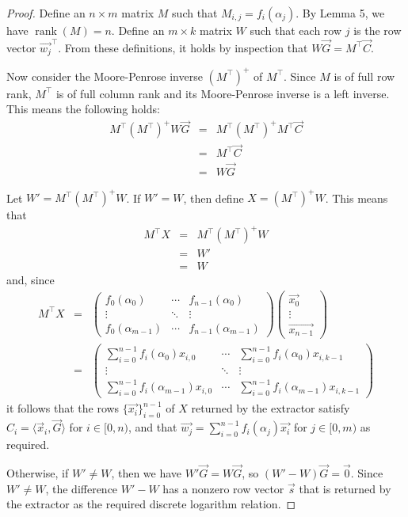 \documentclass{article}
\begin{document}
\begin{proof}
	Define an $n \times m$ matrix $M$ such that $M_{i,j} = f_i(\alpha_j)$.
	By Lemma 5, we have $\operatorname{rank}(M) = n$.
	Define an $m \times k$ matrix $W$ such that each row $j$ is the row vector $\vec{w_j}^\top$.
	From these definitions, it holds by inspection that $W\vec{G} = M^\top \vec{C}$.

	Now consider the Moore-Penrose inverse $(M^\top)^+$ of $M^\top$.
	Since $M$ is of full row rank, $M^\top$ is of full column rank and its Moore-Penrose inverse is a left inverse.
	This means the following holds:
	\begin{eqnarray*}
		M^\top (M^\top)^+W \vec{G} &=& M^\top (M^\top)^+ M^\top \vec{C} \\
		&=& M^\top \vec{C} \\
		&=& W \vec{G}
	\end{eqnarray*}

	Let $W' = M^\top (M^\top)^+ W$.
	If $W' = W$, then define $X = (M^\top)^+ W$.
	This means that
	\begin{eqnarray*}
		M^\top X &=& M^\top (M^\top)^+ W \\
		&=& W' \\
		&=& W
	\end{eqnarray*}
	and, since
	\begin{eqnarray*}
		M^\top X &=&
		\begin{pmatrix}
			f_0(\alpha_0) & \cdots & f_{n-1}(\alpha_0) \\
			\vdots & \ddots & \vdots \\
			f_0(\alpha_{m-1}) & \cdots & f_{n-1}(\alpha_{m-1})
		\end{pmatrix}
		\begin{pmatrix}
			\vec{x_0} \\
			\vdots \\
			\vec{x_{n-1}}
		\end{pmatrix}
		\\ &=&
		\begin{pmatrix}
			\sum_{i=0}^{n-1} f_i(\alpha_0) x_{i,0} & \cdots & \sum_{i=0}^{n-1} f_i(\alpha_0) x_{i,k-1} \\
			\vdots & \ddots & \vdots \\
			\sum_{i=0}^{n-1} f_i(\alpha_{m-1}) x_{i,0} & \cdots & \sum_{i=0}^{n-1} f_i(\alpha_{m-1}) x_{i,k-1}
		\end{pmatrix}
	\end{eqnarray*}
	it follows that the rows $\{\vec{x_i}\}_{i=0}^{n-1}$ of $X$ returned by the extractor satisfy $C_i = \langle \vec{x}_i, \vec{G} \rangle$ for $i \in [0, n)$, and that $\vec{w_j} = \sum_{i=0}^{n-1} f_i(\alpha_j) \vec{x_i}$ for $j \in [0, m)$ as required.

	Otherwise, if $W' \neq W$, then we have $W'\vec{G} = W\vec{G}$, so $(W' - W)\vec{G} = \vec{0}$.
	Since $W' \neq W$, the difference $W' - W$ has a nonzero row vector $\vec{s}$ that is returned by the extractor as the required discrete logarithm relation.
\end{proof}
\end{document}
